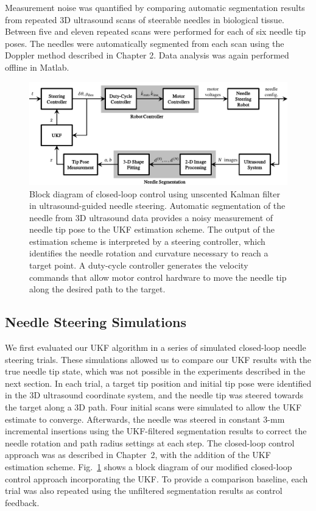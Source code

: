 Measurement noise was quantified by comparing automatic segmentation results from repeated 3D ultrasound scans of steerable needles in biological tissue. Between five and eleven repeated scans were performed for each of six needle tip poses. The needles were automatically segmented from each scan using the Doppler method described in Chapter 2. Data analysis was again performed offline in Matlab.

\begin{figure}[!t]
\centering
\includegraphics[width=\columnwidth]{Images/Chapter4/UKFBlockDiagram/UKFBlockDiagram}%
\caption[Block diagram of closed-loop control algorithm with UKF]{Block diagram of closed-loop control using unscented Kalman filter in ultrasound-guided needle steering. Automatic segmentation of the needle from 3D ultrasound data provides a noisy measurement of needle tip pose to the UKF estimation scheme. The output of the estimation scheme is interpreted by a steering controller, which identifies the needle rotation and curvature necessary to reach a target point. A duty-cycle controller generates the velocity commands that allow motor control hardware to move the needle tip along the desired path to the target.}
\label{fig:UKFBlockDiagram}
\end{figure}

\subsection{Needle Steering Simulations}
We first evaluated our UKF algorithm in a series of simulated closed-loop needle steering trials. These simulations allowed us to compare our UKF results with the true needle tip state, which was not possible in the experiments described in the next section. In each trial, a target tip position and initial tip pose were identified in the 3D ultrasound coordinate system, and the needle tip was steered towards the target along a 3D path. Four initial scans were simulated to allow the UKF estimate to converge. Afterwards, the needle was steered in constant 3-mm incremental insertions using the UKF-filtered segmentation results to correct the needle rotation and path radius settings at each step. The closed-loop control approach was as described in Chapter~2, with the addition of the UKF estimation scheme. Fig.~\ref{fig:UKFBlockDiagram} shows a block diagram of our modified closed-loop control approach incorporating the UKF. To provide a comparison baseline, each trial was also repeated using the unfiltered segmentation results as control feedback. 

